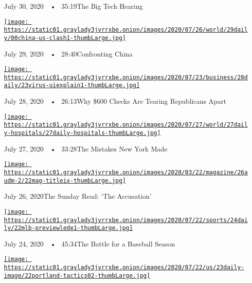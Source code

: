 July 30, 2020~~•~ 35:19The Big Tech Hearing

\href{https://www.nytimes3xbfgragh.onion/2020/07/29/podcasts/the-daily/china-trump-foreign-policy.html?action=click\&module=audio-series-bar\&region=header\&pgtype=Article}{\texttt{[image: https://static01.graylady3jvrrxbe.onion/images/2020/07/26/world/29daily/00china-us-clash1-thumbLarge.jpg]}}

July 29, 2020~~•~ 28:40Confronting China

\href{https://www.nytimes3xbfgragh.onion/2020/07/28/podcasts/the-daily/unemployment-benefits-coronavirus.html?action=click\&module=audio-series-bar\&region=header\&pgtype=Article}{\texttt{[image: https://static01.graylady3jvrrxbe.onion/images/2020/07/23/business/28daily/23virus-uiexplain1-thumbLarge.jpg]}}

July 28, 2020~~•~ 26:13Why \$600 Checks Are Tearing Republicans Apart

\href{https://www.nytimes3xbfgragh.onion/2020/07/27/podcasts/the-daily/new-york-hospitals-covid.html?action=click\&module=audio-series-bar\&region=header\&pgtype=Article}{\texttt{[image: https://static01.graylady3jvrrxbe.onion/images/2020/07/27/world/27daily-hospitals/27daily-hospitals-thumbLarge.jpg]}}

July 27, 2020~~•~ 33:28The Mistakes New York Made

\href{https://www.nytimes3xbfgragh.onion/2020/07/26/podcasts/the-daily/the-accusation-the-sunday-read.html?action=click\&module=audio-series-bar\&region=header\&pgtype=Article}{\texttt{[image: https://static01.graylady3jvrrxbe.onion/images/2020/03/22/magazine/26audm-2/22mag-titleix-thumbLarge.jpg]}}

July 26, 2020The Sunday Read: `The Accusation'

\href{https://www.nytimes3xbfgragh.onion/2020/07/24/podcasts/the-daily/mlb-baseball-season-coronavirus.html?action=click\&module=audio-series-bar\&region=header\&pgtype=Article}{\texttt{[image: https://static01.graylady3jvrrxbe.onion/images/2020/07/22/sports/24daily/22mlb-previewlede1-thumbLarge.jpg]}}

July 24, 2020~~•~ 45:34The Battle for a Baseball Season

\href{https://www.nytimes3xbfgragh.onion/2020/07/23/podcasts/the-daily/portland-protests.html?action=click\&module=audio-series-bar\&region=header\&pgtype=Article}{\texttt{[image: https://static01.graylady3jvrrxbe.onion/images/2020/07/22/us/23daily-image/22portland-tactics02-thumbLarge.jpg]}}

